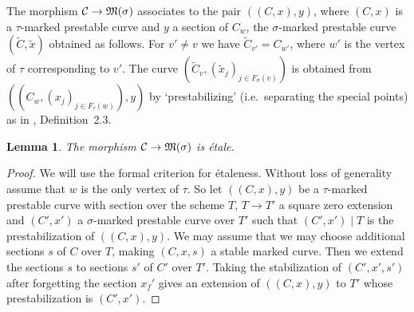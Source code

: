 \documentclass{article}
\newtheorem{lem}[prop]{Lemma}
\renewcommand{\tilde}{\widetilde}
\newcommand{\MM}{{\frak M}}
\newcommand{\cC}{{\cal C}}
\newcommand{\resto}{{ \mid }}
\begin{document}
The morphism $\cC\to\MM(\sigma)$ associates to the pair $((C,x),y)$,
where $(C,x)$ is a $\tau$-marked prestable curve and $y$ a section of
$C_w$, the $\sigma$-marked prestable curve $(\tilde{C},\tilde{x})$
obtained as follows. For $v'\not=v$ we have $\tilde{C}_{v'}=C_{w'}$,
where $w'$ is the vertex of $\tau$ corresponding to $v'$. The curve
$(\tilde{C}_v,(\tilde{x}_j)_{j\in F_{\sigma}(v)})$ is obtained from
$((C_w,(x_j)_{j\in F_{\tau}(w)}),y)$ by `prestabilizing' (i.e.\
separating the special points) as in \cite{knudsen}, Definition~2.3.

\begin{lem}\label{loem}
The morphism $\cC\to\MM(\sigma)$ is \'etale.
\end{lem}
\begin{proof}
We will use the formal criterion for \'etaleness. Without loss of
generality assume that $w$ is the only vertex of $\tau$. So let
$((C,x),y)$ be a $\tau$-marked prestable curve with section over the
scheme $T$, $T\to T'$ a square zero extension and $(C',x')$ a
$\sigma$-marked prestable curve over $T'$ such that $(C',x')\resto T$
is the prestabilization of $((C,x),y)$. We may assume that we may
choose additional sections $s$ of $C$ over $T$, making $(C,x,s)$ a
stable marked curve. Then we extend the sections $s$ to sections $s'$
of $C'$ over $T'$. Taking the stabilization of $(C',x',s')$ after
forgetting the section $x_f'$ gives an extension of $((C,x),y)$ to
$T'$ whose prestabilization is $(C',x')$.
\end{proof}
\end{document}
